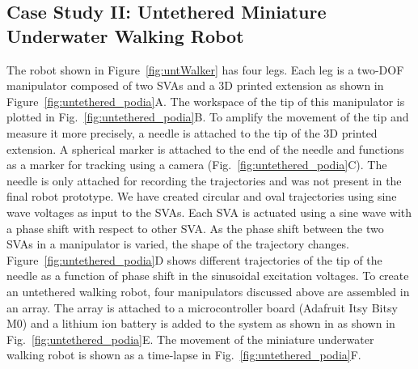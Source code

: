 \subsection{Case Study II: Untethered Miniature Underwater Walking Robot} 
The robot shown in Figure~\ref{fig:untWalker} has four legs. Each leg is a two-DOF manipulator composed of two SVAs and a 3D printed extension as shown in Figure~\ref{fig:untethered_podia}A. The workspace of the tip of this manipulator is plotted in Fig.~\ref{fig:untethered_podia}B. To amplify the movement of the tip and measure it more precisely, a needle is attached to the tip of the 3D printed extension. A spherical marker is attached to the end of the needle and functions as a marker for tracking using a camera (Fig.~\ref{fig:untethered_podia}C). The needle is only attached for recording the trajectories and was not present in the final robot prototype. We have created circular and oval trajectories using sine wave voltages as input to the SVAs. Each SVA is actuated using a sine wave with a phase shift with respect to other SVA. As the phase shift between the two SVAs in a manipulator is varied, the shape of the trajectory changes. Figure~\ref{fig:untethered_podia}D shows different trajectories of the tip of the needle as a function of phase shift in the sinusoidal excitation voltages. To create an untethered walking robot, four manipulators discussed above are assembled in an array. The array is attached to a microcontroller board (Adafruit Itsy Bitsy M0) and a lithium ion battery is added to the system as shown in as shown in Fig.~\ref{fig:untethered_podia}E. The movement of the miniature underwater walking robot is shown as a time-lapse in Fig.~\ref{fig:untethered_podia}F.
